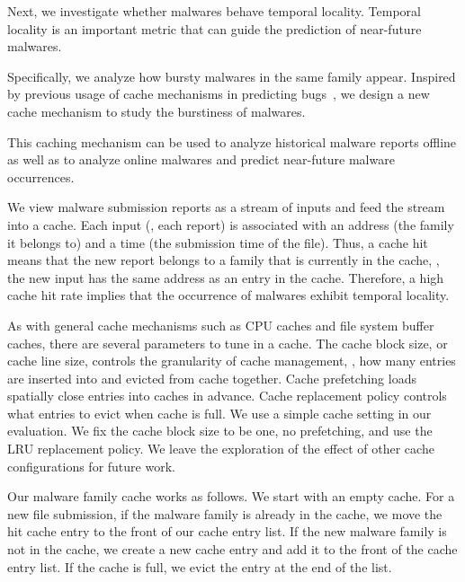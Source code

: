 

Next, we investigate whether malwares behave temporal locality.
Temporal locality is an important metric that can guide the 
prediction of near-future malwares.

Specifically, we analyze how bursty malwares in the same family appear.  
Inspired by previous usage of cache mechanisms in predicting bugs~\cite{predicting},
we design a new cache mechanism to study the burstiness of malwares.

This caching mechanism can be used to analyze historical malware reports offline 
as well as to analyze online malwares and predict near-future malware occurrences.

We view malware submission reports as a stream of inputs 
and feed the stream into a cache. 
Each input (\ie, each report) is associated with an address (the family it belongs to) and a time (the submission time of the file).
Thus, a cache hit means that the new report belongs to a family that is currently in the cache,
\ie, the new input has the same address as an entry in the cache.
Therefore, a high cache hit rate implies that the occurrence of malwares exhibit temporal locality.

As with general cache mechanisms such as CPU caches and file system buffer caches, 
there are several parameters to tune in a cache.
The cache block size, or cache line size, controls the granularity of cache management, 
\ie, how many entries are inserted into and evicted from cache together.
Cache prefetching loads spatially close entries into caches in advance. 
Cache replacement policy controls what entries to evict when cache is full.
We use a simple cache setting in our evaluation. 
We fix the cache block size to be one, no prefetching, 
and use the LRU replacement policy.
We leave the exploration of the effect of other cache configurations for future work. 

Our malware family cache works as follows.
We start with an empty cache. 
For a new file submission, if the malware family is already in the cache, 
we move the hit cache entry to the front of our cache entry list. 
If the new malware family is not in the cache, 
we create a new cache entry and add it to the front of the cache entry list.
If the cache is full, we evict the entry at the end of the list. 


